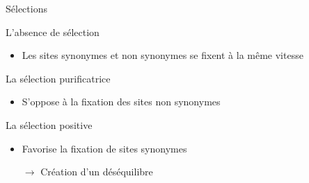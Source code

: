 \begin{frame}{Sélections}

	\begin{block}{L'absence de sélection}
        \begin{itemize}
            \item Les sites synonymes et non synonymes se fixent à la même vitesse
        \end{itemize}
    \end{block}

 
    \pause
    \begin{block}{La sélection purificatrice}
        \begin{itemize}
            \item S'oppose à la fixation des sites non synonymes
        \end{itemize}
    \end{block}

    \pause
    \begin{block}{La sélection positive}
        \begin{itemize}
            \item Favorise la fixation de sites synonymes
        \end{itemize}
    \end{block}
    \pause
    \begin{itemize}
        \item[$\rightarrow$] Création d'un déséquilibre
    \end{itemize}
    
\end{frame}

